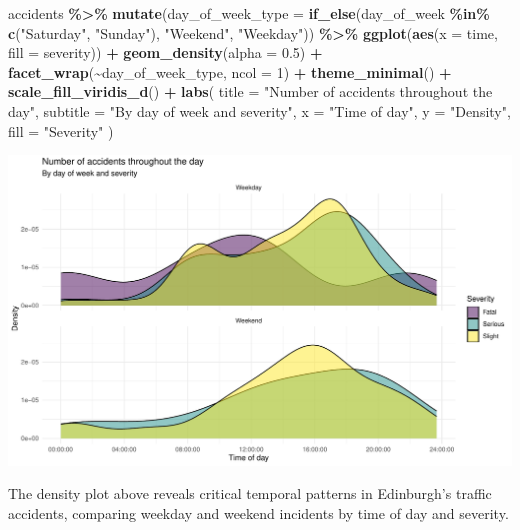 \documentclass[
]{article}
\newenvironment{Shaded}{\begin{snugshade}}{\end{snugshade}}
\newcommand{\AttributeTok}[1]{\textcolor[rgb]{0.13,0.29,0.53}{#1}}
\newcommand{\DecValTok}[1]{\textcolor[rgb]{0.00,0.00,0.81}{#1}}
\newcommand{\FloatTok}[1]{\textcolor[rgb]{0.00,0.00,0.81}{#1}}
\newcommand{\FunctionTok}[1]{\textcolor[rgb]{0.13,0.29,0.53}{\textbf{#1}}}
\newcommand{\NormalTok}[1]{#1}
\newcommand{\SpecialCharTok}[1]{\textcolor[rgb]{0.81,0.36,0.00}{\textbf{#1}}}
\newcommand{\StringTok}[1]{\textcolor[rgb]{0.31,0.60,0.02}{#1}}
\begin{document}
\begin{Shaded}
\begin{Highlighting}[]
\NormalTok{accidents }\SpecialCharTok{\%\textgreater{}\%}
  \FunctionTok{mutate}\NormalTok{(}\AttributeTok{day\_of\_week\_type =} \FunctionTok{if\_else}\NormalTok{(day\_of\_week }\SpecialCharTok{\%in\%} \FunctionTok{c}\NormalTok{(}\StringTok{"Saturday"}\NormalTok{, }\StringTok{"Sunday"}\NormalTok{), }\StringTok{"Weekend"}\NormalTok{, }\StringTok{"Weekday"}\NormalTok{)) }\SpecialCharTok{\%\textgreater{}\%}
  \FunctionTok{ggplot}\NormalTok{(}\FunctionTok{aes}\NormalTok{(}\AttributeTok{x =}\NormalTok{ time, }\AttributeTok{fill =}\NormalTok{ severity)) }\SpecialCharTok{+}
  \FunctionTok{geom\_density}\NormalTok{(}\AttributeTok{alpha =} \FloatTok{0.5}\NormalTok{) }\SpecialCharTok{+}
  \FunctionTok{facet\_wrap}\NormalTok{(}\SpecialCharTok{\textasciitilde{}}\NormalTok{day\_of\_week\_type, }\AttributeTok{ncol =} \DecValTok{1}\NormalTok{) }\SpecialCharTok{+}
  \FunctionTok{theme\_minimal}\NormalTok{() }\SpecialCharTok{+}
  \FunctionTok{scale\_fill\_viridis\_d}\NormalTok{() }\SpecialCharTok{+}
  \FunctionTok{labs}\NormalTok{(}
    \AttributeTok{title =} \StringTok{"Number of accidents throughout the day"}\NormalTok{,}
    \AttributeTok{subtitle =} \StringTok{"By day of week and severity"}\NormalTok{,}
    \AttributeTok{x =} \StringTok{"Time of day"}\NormalTok{,}
    \AttributeTok{y =} \StringTok{"Density"}\NormalTok{,}
    \AttributeTok{fill =} \StringTok{"Severity"}
\NormalTok{  )}
\end{Highlighting}
\end{Shaded}

\includegraphics[width=0.8\linewidth]{hw-03-accidents_files/figure-latex/time_severity_plot-1}

The density plot above reveals critical temporal patterns in Edinburgh's
traffic accidents, comparing weekday and weekend incidents by time of
day and severity.
\end{document}
